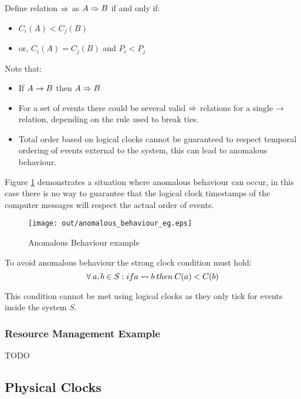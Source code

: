 \documentclass[a4paper]{article}
\begin{document}
Define relation $\Rightarrow$ as $A \Rightarrow B$ if and only if:

\begin{itemize}
  \item $C_{i}(A) < C_{j}(B)$
  \item or, $C_{i}(A) = C_{j}(B)$ and $P_{i} < P_{j}$
\end{itemize}

Note that:

\begin{itemize}
  \item If $A \rightarrow B$ then $A \Rightarrow B$
  \item For a set of events there could be several valid $\Rightarrow$
        relations for a single $\rightarrow$ relation, depending on the rule
        used to break ties.
  \item Total order based on logical clocks cannot be guaranteed to respect
        temporal ordering of events external to the system, this can lead to
        anomalous behaviour.
\end{itemize}

Figure \ref{fig:anomalous_behaviour_eg} demonstrates a situation where anomalous
behaviour can occur, in this case there is no way to guarantee that the logical
clock timestamps of the computer messages will respect the actual order of
events.

\begin{figure}[h!]
  \centering
  \texttt{[image: out/anomalous\_behaviour\_eg.eps]}
  \caption{Anomalous Behaviour example}
  \label{fig:anomalous_behaviour_eg}
\end{figure}
\FloatBarrier

To avoid anomalous behaviour the strong clock condition must hold:
\[
  \forall \: a, b \in S: if a \leadsto b \: then \: C(a) < C(b)
\]

This condition cannot be met using logical clocks as they only tick for events
inside the system $S$.

\subsubsection{Resource Management Example}

TODO

\subsection{Physical Clocks}
\end{document}
